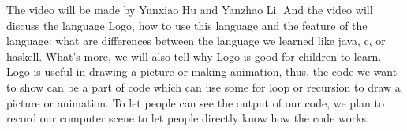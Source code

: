 \documentclass[a4paper,11pt]{article}
\begin{document}
  
The video will be made by Yunxiao Hu and Yanzhao Li. And the video will discuss the language Logo, how to use this language and the feature of the language: what are differences between the language we learned like java, c, or haskell. What's more, we will also tell why Logo is good for children to learn. Logo is useful in drawing a picture or making animation, thus, the code we want to show can be a part of code which can use some for loop or recursion to draw a picture or animation. To let people can see the output of our code, we plan to record our computer scene to let people directly know how the code works.
\end{document}
